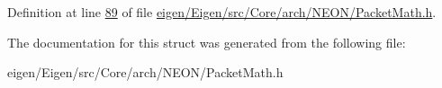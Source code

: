 Definition at line \hyperlink{eigen_2_eigen_2src_2_core_2arch_2_n_e_o_n_2_packet_math_8h_source_l00089}{89} of file \hyperlink{eigen_2_eigen_2src_2_core_2arch_2_n_e_o_n_2_packet_math_8h_source}{eigen/\+Eigen/src/\+Core/arch/\+N\+E\+O\+N/\+Packet\+Math.\+h}.



The documentation for this struct was generated from the following file\+:\begin{DoxyCompactItemize}
\item 
eigen/\+Eigen/src/\+Core/arch/\+N\+E\+O\+N/\+Packet\+Math.\+h\end{DoxyCompactItemize}
